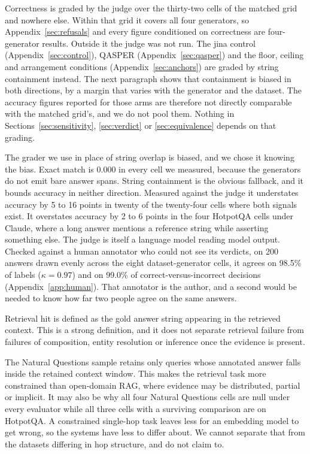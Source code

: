 \documentclass[11pt]{article}
\newcommand{\movedref}{Appendix}            %
\newcommand{\movedref}{Section}
\begin{document}
Correctness is graded by the judge over the thirty-two cells of the matched grid and nowhere else. Within that grid it covers all four generators, so \movedref~\ref{sec:refusals} and every figure conditioned on correctness are four-generator results. Outside it the judge was not run. The jina control (\movedref~\ref{sec:control}), QASPER (Appendix~\ref{sec:qasper}) and the floor, ceiling and arrangement conditions (Appendix~\ref{sec:anchors}) are graded by string containment instead. The next paragraph shows that containment is biased in both directions, by a margin that varies with the generator and the dataset. The accuracy figures reported for those arms are therefore not directly comparable with the matched grid's, and we do not pool them. Nothing in Sections~\ref{sec:sensitivity}, \ref{sec:verdict} or \ref{sec:equivalence} depends on that grading.

The grader we use in place of string overlap is biased, and we chose it knowing the bias. Exact match is 0.000 in every cell we measured, because the generators do not emit bare answer spans. String containment is the obvious fallback, and it bounds accuracy in neither direction. Measured against the judge it understates accuracy by 5 to 16 points in twenty of the twenty-four cells where both signals exist. It overstates accuracy by 2 to 6 points in the four HotpotQA cells under Claude, where a long answer mentions a reference string while asserting something else. The judge is itself a language model reading model output. Checked against a human annotator who could not see its verdicts, on 200 answers drawn evenly across the eight dataset-generator cells, it agrees on 98.5\% of labels ($\kappa = 0.97$) and on 99.0\% of correct-versus-incorrect decisions (Appendix~\ref{app:human}). That annotator is the author, and a second would be needed to know how far two people agree on the same answers.

Retrieval hit is defined as the gold answer string appearing in the retrieved context. This is a strong definition, and it does not separate retrieval failure from failures of composition, entity resolution or inference once the evidence is present.

The Natural Questions sample retains only queries whose annotated answer falls inside the retained context window. This makes the retrieval task more constrained than open-domain RAG, where evidence may be distributed, partial or implicit. It may also be why all four Natural Questions cells are null under every evaluator while all three cells with a surviving comparison are on HotpotQA. A constrained single-hop task leaves less for an embedding model to get wrong, so the systems have less to differ about. We cannot separate that from the datasets differing in hop structure, and do not claim to.
\end{document}
